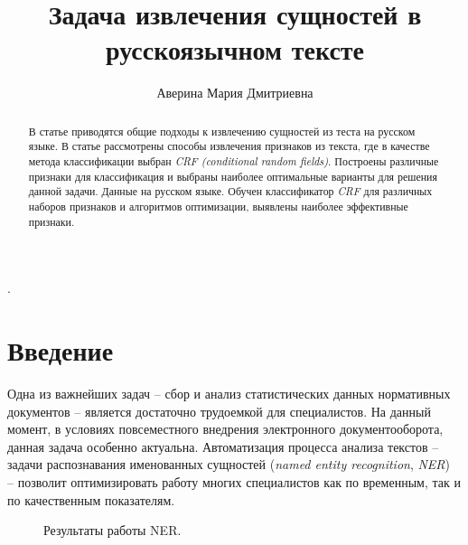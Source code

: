 \documentclass{csmathnotes}
\title{Задача извлечения сущностей в русскоязычном тексте}
\author{Аверина Мария Дмитриевна}
\affiliation{Ярославский государственный университет им. П.\,Г. Демидова}
\begin{document}
\maketitle

\begin{abstract}
В статье приводятся общие подходы к извлечению сущностей из теста на русском языке. В статье рассмотрены способы извлечения признаков из текста, где в качестве метода классификации выбран \emph{CRF (conditional random fields)}. Построены различные признаки для классификация и выбраны наиболее оптимальные варианты для решения данной задачи. Данные на русском языке. Обучен классификатор \emph{CRF} для различных наборов признаков и алгоритмов оптимизации, выявлены наиболее эффективные признаки.
\end{abstract}

.

\section*{Введение}
Одна из важнейших задач – сбор и анализ статистических данных нормативных
документов – является достаточно трудоемкой для специалистов. На данный момент, в условиях повсеместного внедрения электронного документооборота, данная задача особенно актуальна. Автоматизация процесса анализа текстов – задачи распознавания именованных сущностей (\emph{named entity recognition}, \emph{NER})~\cite{base} – позволит оптимизировать работу многих специалистов как по временным, так и по качественным показателям.

\begin{figure}[h]
	\caption{Результаты работы NER.}
	\label{fig:ner}
\end{figure}
\end{document}
